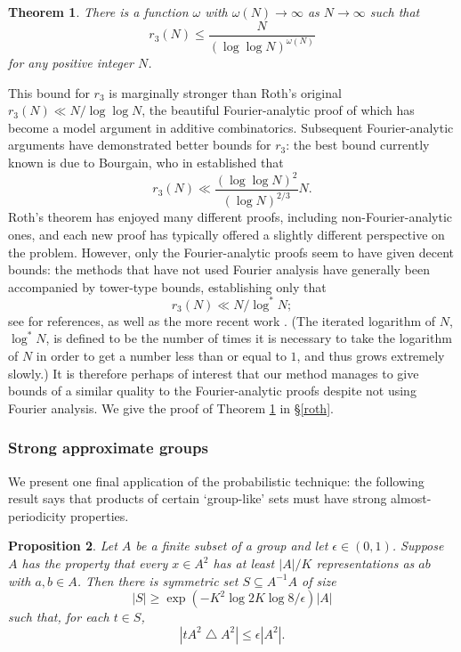 \documentclass[12pt,a4paper,reqno]{amsart}
\numberwithin{equation}{section}
\theoremstyle{plain}
\newtheorem{theorem}{Theorem}[section]
\newtheorem{proposition}[theorem]{Proposition}
\theoremstyle{definition}
\renewcommand{\leq}{\leqslant}
\renewcommand{\geq}{\geqslant}
\renewcommand{\subset}{\subseteq}
\begin{document}
\begin{theorem}\label{roths_theorem}
There is a function $\omega$ with $\omega(N) \to \infty$ as $N \to \infty$ such that 
\[ r_3(N) \leq \frac{N}{(\log\log{N})^{\omega(N)}} \]
for any positive integer $N$.
\end{theorem}

This bound for $r_3$ is marginally stronger than Roth's original $r_3(N) \ll N/\log\log{N}$, the beautiful Fourier-analytic proof of which has become a model argument in additive combinatorics. Subsequent Fourier-analytic arguments have demonstrated better bounds for $r_3$: the best bound currently known is due to Bourgain, who in \cite{bourgain} established that 
\[ r_3(N) \ll \frac{(\log\log N)^2}{(\log N)^{2/3}} N. \]
Roth's theorem has enjoyed many different proofs, including non-Fourier-analytic ones, and each new proof has typically offered a slightly different perspective on the problem. However, only the Fourier-analytic proofs seem to have given decent bounds: the methods that have not used Fourier analysis have generally been accompanied by tower-type bounds, establishing only that 
\[ r_3(N) \ll N /\log^*{N}; \]
see \cite[Chapter 10]{tao-vu} for references, as well as the more recent work \cite{polymath}. (The iterated logarithm of $N$, $\log^*{N}$, is defined to be the number of times it is necessary to take the logarithm of $N$ in order to get a number less than or equal to $1$, and thus grows extremely slowly.) It is therefore perhaps of interest that our method manages to give bounds of a similar quality to the Fourier-analytic proofs despite not using Fourier analysis. We give the proof of Theorem \ref{roths_theorem} in \S\ref{roth}.

\subsubsection*{Strong approximate groups}
We present one final application of the probabilistic technique: the following result says that products of certain `group-like' sets must have strong almost-periodicity properties.

\begin{proposition}\label{discontinuous}
Let $A$ be a finite subset of a group and let $\epsilon \in (0,1)$. Suppose $A$ has the property that every $x \in A^2$ has at least $|A|/K$ representations as $ab$ with $a, b \in A$. Then there is symmetric set $S \subset A^{-1}A$ of size
\[ |S| \geq \exp\left(-K^2 \log{2K} \log{8/\epsilon} \right)|A| \]
such that, for each $t \in S$,
\[ | tA^2 \bigtriangleup A^2 | \leq \epsilon|A^2|. \]
\end{proposition}
\end{document}
